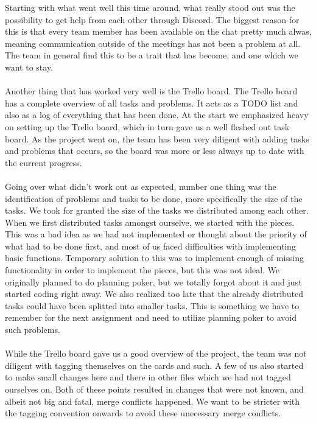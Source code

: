 \documentclass{article}
\begin{document}
\maketitle
Starting with what went well this time around, what really stood out was the possibility to get help from each other through Discord. The biggest reason for this is that every team member has been available on the chat pretty much alwas, meaning communication outside of the meetings has not been a problem at all. The team in general find this to be a trait that has become, and one which we want to stay.\\\\
Another thing that has worked very well is the Trello board. The Trello board has a complete overview of all tasks and problems. It acts as a TODO list and also as a log of everything that has been done. At the start we emphasized heavy on setting up the Trello board, which in turn gave us a well fleshed out task board. As the project went on, the team has been very diligent with adding tasks and problems that occurs, so the board was more or less always up to date with the current progress.\\\\
Going over what didn't work out as expected, number one thing was the identification of problems and tasks to be done, more specifically the size of the tasks. We took for granted the size of the tasks we distributed among each other. When we first distributed tasks amongst ourselve, we started with the pieces. This was a bad idea as we had not implemented or thought about the priority of what had to be done first, and most of us faced difficulties with implementing basic functions. Temporary solution to this was to implement enough of missing functionality in order to implement the pieces, but this was not ideal. We originally planned to do planning poker, but we totally forgot about it and just started coding right away. We also realized too late that the already distributed tasks could have been splitted into smaller tasks. This is something we have to remember for the next assignment and need to utilize planning poker to avoid such problems.\\\\
While the Trello board gave us a good overview of the project, the team was not diligent with tagging themselves on the cards and such. A few of us also started to make small changes here and there in other files which we had not tagged ourselves on. Both of these points resulted in changes that were not known, and albeit not big and fatal, merge conflicts happened. We want to be stricter with the tagging convention onwards to avoid these unecessary merge conflicts.
\end{document}
